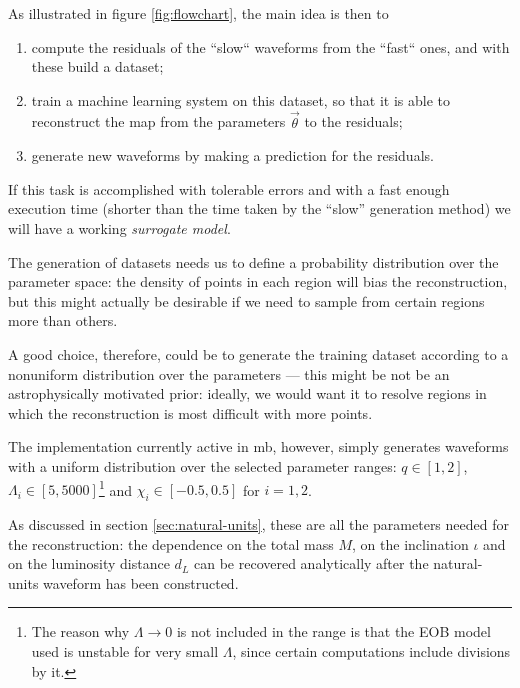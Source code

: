 \documentclass[main.tex]{subfiles}
\begin{document}
As illustrated in figure \ref{fig:flowchart}, the main idea is then to 
\begin{enumerate}
    \item compute the residuals of the ``slow`` waveforms from the ``fast`` ones, and with these build a dataset;
    \item train a machine learning system on this dataset, so that it is able to reconstruct the map from the parameters \(\vec{\theta}\) to the residuals;
    \item generate new waveforms by making a prediction for the residuals.
\end{enumerate}

If this task is accomplished with tolerable errors and with a fast enough execution time (shorter than the time taken by the ``slow'' generation method) we will have a working \emph{surrogate model}. 

The generation of datasets needs us to define a probability distribution over the parameter space: the density of points in each region will bias the reconstruction, but this might actually be desirable if we need to sample from certain regions more than others. 

A good choice, therefore, could be to generate the training dataset according to a nonuniform distribution over the parameters --- this might be not be an astrophysically motivated prior: ideally, we would want it to resolve regions in which the reconstruction is most difficult with more points.

The implementation currently active in \ac{mb}, however, simply generates waveforms with a uniform distribution over the selected parameter ranges: \(q \in [1, 2]\), \(\Lambda _i \in [5, 5000]\)\footnote{The reason why \(\Lambda \to 0\) is not included in the range is that the \ac{EOB} model used is unstable for very small \(\Lambda \), since certain computations include divisions by it.} and \(\chi_i \in [-0.5, 0.5]\) for \(i = 1, 2\).

As discussed in section \ref{sec:natural-units}, these are all the parameters needed for the reconstruction: the dependence on the total mass \(M\), on the inclination \(\iota \) and on the luminosity distance \(d_L\) can be recovered analytically after the natural-units waveform has been constructed.  

\end{document}
